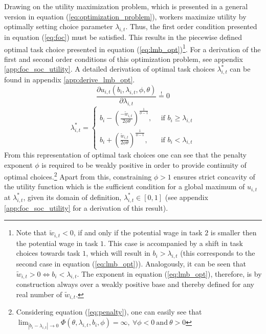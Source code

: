 \documentclass[../main.tex]{subfiles}
\begin{document}
Drawing on the utility maximization problem, which is presented in a general version in equation (\ref{eq:optimization_problem}), workers maximize utility by optimally setting choice parameter $\lambda_{i,t}$. Thus, the first order condition presented in equation (\ref{eq:foc}) must be satisfied. This results in the piecewise defined optimal task choice presented in equation (\ref{eq:lmb_opt})\footnote{Note that $\tilde{w}_{i,t} < 0$, if and only if the potential wage in task $2$ is smaller then the potential wage in task $1$. This case is accompanied by a shift in task choices towards task $1$, which will result in $b_i > \lambda_{i,t}$ (this corresponds to the second case in equation (\ref{eq:lmb_opt})).  Analogously, it can be seen that $\tilde{w}_{i,t} > 0 \iff b_i < \lambda_{i,t}$. The exponent in equation (\ref{eq:lmb_opt}), therefore, is by construction always over a weakly positive base and thereby defined for any real number of $\tilde{w}_{i,t}$.}. For a derivation of the first and second order conditions of this optimization problem, see appendix \ref{app:foc_soc_utility}. A detailed derivation of optimal task choices $\lambda_{i,t}^*$ can be found in appendix \ref{app:derive_lmb_opt}. 
\begin{equation} \label{eq:foc}
	\frac{\partial u_{i,t}(b_i, \lambda_{i,t}, \phi, \theta)}{\partial \lambda_{i,t}} \overset{!}{=} 0
\end{equation}
\begin{equation} \label{eq:lmb_opt}
	\lambda^*_{i,t} = \left\{
	\begin{array}{ll}
		b_i - (\frac{- \tilde{w}_{i,t}}{2 \phi \theta})^{\frac{1}{\phi -1}}, \: & \: \text{if $b_i \geq \lambda_{i,t}$}\\
		b_i + (\frac{\tilde{w}_{i,t}}{2 \phi \theta})^{\frac{1}{\phi - 1}}, \: & \: \text{if $b_i < \lambda_{i,t}$}
	\end{array}
\right.
\end{equation}
From this representation of optimal task choices one can see that the penalty exponent $\phi$ is required to be weakly positive in order to provide continuity of optimal choices.\footnote{Considering equation (\ref{eq:penalty}), one can easily see that $\lim_{|b_i - \lambda_{i,t}|\to 0} \Phi (\theta, \lambda_{i,t}, b_i, \phi) = \infty, \: \forall \phi < 0 \: \text{and} \: \theta > 0$} Apart from this, constraining $\phi > 1$ ensures strict concavity of the utility function which is the sufficient condition for a global maximum of $u_{i,t}$ at $\lambda_{i,t}^*$, given its domain of definition, $\lambda_{i,t}^* \in [0,1]$ (see appendix \ref{app:foc_soc_utility} for a derivation of this result). 
\end{document}
